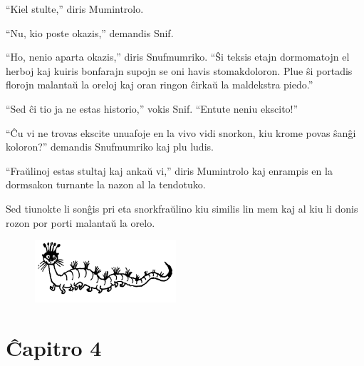 ``Kiel stulte,'' diris Mumintrolo.

``Nu, kio poste okazis,'' demandis Snif.

``Ho, nenio aparta okazis,'' diris Snufmumriko. ``Ŝi teksis etajn dormomatojn el herboj kaj kuiris bonfarajn supojn se oni havis stomakdoloron. Plue ŝi portadis florojn malantaŭ la oreloj kaj oran ringon ĉirkaŭ la maldekstra piedo.''

``Sed ĉi tio ja ne estas historio,'' vokis Snif. ``Entute neniu ekscito!''

``Ĉu vi ne trovas ekscite unuafoje en la vivo vidi snorkon, kiu krome povas ŝanĝi koloron?'' demandis Snufmumriko kaj plu ludis.

``Fraŭlinoj estas stultaj kaj ankaŭ vi,'' diris Mumintrolo kaj enrampis en la dormsakon turnante la nazon al la tendotuko.

Sed tiunokte li sonĝis pri eta snorkfraŭlino kiu similis lin mem kaj al kiu li donis rozon por porti malantaŭ la orelo.

\begin{figure}[htbp]
\centering
\includegraphics[width=150pt,height=66pt]{3-14.png}
\caption{}
\label{3-14}
\end{figure}

\chapter*[Ĉapitro 4]{Ĉapitro 4}



